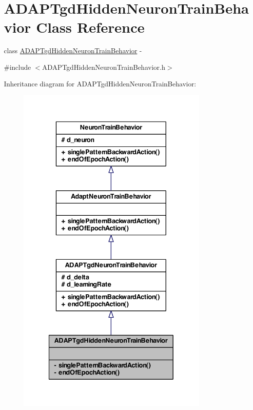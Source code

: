 \hypertarget{class_a_d_a_p_tgd_hidden_neuron_train_behavior}{
\section{ADAPTgdHiddenNeuronTrainBehavior Class Reference}
\label{class_a_d_a_p_tgd_hidden_neuron_train_behavior}
}


class \hyperlink{class_a_d_a_p_tgd_hidden_neuron_train_behavior}{ADAPTgdHiddenNeuronTrainBehavior} -\/  




{\ttfamily \#include $<$ADAPTgdHiddenNeuronTrainBehavior.h$>$}



Inheritance diagram for ADAPTgdHiddenNeuronTrainBehavior:
\nopagebreak
\begin{figure}[H]
\begin{center}
\leavevmode
\includegraphics[width=270pt]{class_a_d_a_p_tgd_hidden_neuron_train_behavior__inherit__graph}
\end{center}
\end{figure}


